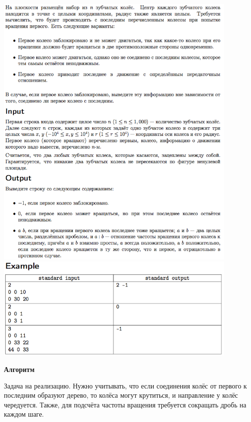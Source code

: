 \documentclass[a4paper,12pt]{article}
\begin{document}
\begin{center}
\includegraphics[width=0.9\textwidth]{OC_China_2016/N_1.png}\\
\includegraphics[width=0.9\textwidth]{OC_China_2016/N_2.png}\\ [1cm]
\end{center}

\textbf{{\large Алгоритм}}

Задача на реализацию. Нужно учитывать, что если соединения колёс от первого к последним образуют дерево, то колёса могут крутиться, и направление у колёс чередуется. Также, для подсчёта частоты вращения требуется сокращать дробь на каждом шаге.  \\
\end{document}
